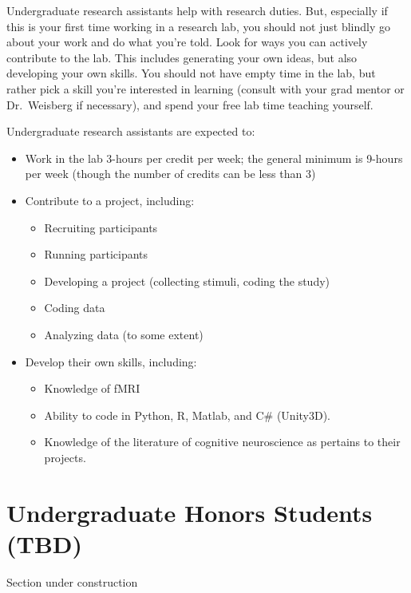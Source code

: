 \documentclass[
  12pt,
]{book}
\begin{document}
Undergraduate research assistants help with research duties. But, especially if this is your first time working in a research lab, you should not just blindly go about your work and do what you're told. Look for ways you can actively contribute to the lab. This includes generating your own ideas, but also developing your own skills. You should not have empty time in the lab, but rather pick a skill you're interested in learning (consult with your grad mentor or Dr.~Weisberg if necessary), and spend your free lab time teaching yourself.

Undergraduate research assistants are expected to:

\begin{itemize}
\item
  Work in the lab 3-hours per credit per week; the general minimum is 9-hours per week (though the number of credits can be less than 3)
\item
  Contribute to a project, including:

  \begin{itemize}
  \item
    Recruiting participants
  \item
    Running participants
  \item
    Developing a project (collecting stimuli, coding the study)
  \item
    Coding data
  \item
    Analyzing data (to some extent)
  \end{itemize}
\item
  Develop their own skills, including:

  \begin{itemize}
  \item
    Knowledge of fMRI
  \item
    Ability to code in Python, R, Matlab, and C\# (Unity3D).
  \item
    Knowledge of the literature of cognitive neuroscience as pertains to their projects.
  \end{itemize}
\end{itemize}

\hypertarget{undergraduate-honors-students-tbd}{%
\section{Undergraduate Honors Students (TBD)}\label{undergraduate-honors-students-tbd}}

Section under construction
\end{document}
